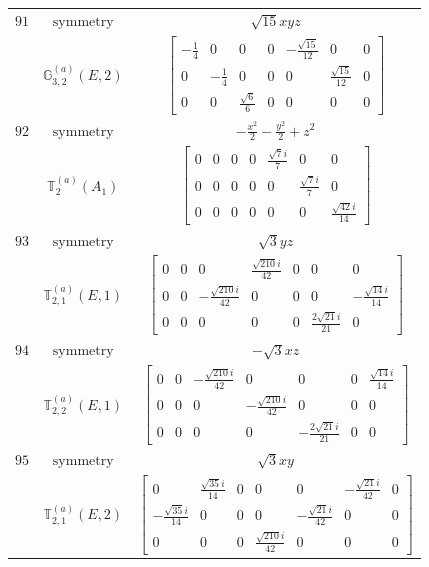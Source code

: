 \documentclass[fleqn,8pt,landscape]{jsarticle}
\begin{document}
\begin{longtable}{ccc}
$ 91 $ & $ \text{symmetry} $ & $ \sqrt{15} x y z $ \\
$  $ & $ \mathbb{G}_{3,2}^{(a)}(E,2) $ & $ \begin{bmatrix} - \frac{1}{4} & 0 & 0 & 0 & - \frac{\sqrt{15}}{12} & 0 & 0 \\ 0 & - \frac{1}{4} & 0 & 0 & 0 & \frac{\sqrt{15}}{12} & 0 \\ 0 & 0 & \frac{\sqrt{6}}{6} & 0 & 0 & 0 & 0 \end{bmatrix} $ \\ \hline
$ 92 $ & $ \text{symmetry} $ & $ - \frac{x^{2}}{2} - \frac{y^{2}}{2} + z^{2} $ \\
$  $ & $ \mathbb{T}_{2}^{(a)}(A_{1}) $ & $ \begin{bmatrix} 0 & 0 & 0 & 0 & \frac{\sqrt{7} i}{7} & 0 & 0 \\ 0 & 0 & 0 & 0 & 0 & \frac{\sqrt{7} i}{7} & 0 \\ 0 & 0 & 0 & 0 & 0 & 0 & \frac{\sqrt{42} i}{14} \end{bmatrix} $ \\ \hline
$ 93 $ & $ \text{symmetry} $ & $ \sqrt{3} y z $ \\
$  $ & $ \mathbb{T}_{2,1}^{(a)}(E,1) $ & $ \begin{bmatrix} 0 & 0 & 0 & \frac{\sqrt{210} i}{42} & 0 & 0 & 0 \\ 0 & 0 & - \frac{\sqrt{210} i}{42} & 0 & 0 & 0 & - \frac{\sqrt{14} i}{14} \\ 0 & 0 & 0 & 0 & 0 & \frac{2 \sqrt{21} i}{21} & 0 \end{bmatrix} $ \\ \hline
$ 94 $ & $ \text{symmetry} $ & $ - \sqrt{3} x z $ \\
$  $ & $ \mathbb{T}_{2,2}^{(a)}(E,1) $ & $ \begin{bmatrix} 0 & 0 & - \frac{\sqrt{210} i}{42} & 0 & 0 & 0 & \frac{\sqrt{14} i}{14} \\ 0 & 0 & 0 & - \frac{\sqrt{210} i}{42} & 0 & 0 & 0 \\ 0 & 0 & 0 & 0 & - \frac{2 \sqrt{21} i}{21} & 0 & 0 \end{bmatrix} $ \\ \hline
$ 95 $ & $ \text{symmetry} $ & $ \sqrt{3} x y $ \\
$  $ & $ \mathbb{T}_{2,1}^{(a)}(E,2) $ & $ \begin{bmatrix} 0 & \frac{\sqrt{35} i}{14} & 0 & 0 & 0 & - \frac{\sqrt{21} i}{42} & 0 \\ - \frac{\sqrt{35} i}{14} & 0 & 0 & 0 & - \frac{\sqrt{21} i}{42} & 0 & 0 \\ 0 & 0 & 0 & \frac{\sqrt{210} i}{42} & 0 & 0 & 0 \end{bmatrix} $ \\ \hline

\end{longtable}
\end{document}
